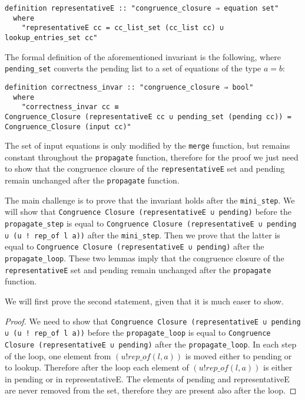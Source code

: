 \begin{lstlisting}
definition representativeE :: "congruence_closure ⇒ equation set"
  where
    "representativeE cc = cc_list_set (cc_list cc) ∪ lookup_entries_set cc"
\end{lstlisting}

The formal definition of the aforementioned invariant is the following, where \lstinline{pending_set} converts the pending list to a set of equations of the type $a = b$:

\begin{lstlisting}
definition correctness_invar :: "congruence_closure ⇒ bool"
  where
    "correctness_invar cc ≡
Congruence_Closure (representativeE cc ∪ pending_set (pending cc)) = Congruence_Closure (input cc)"
\end{lstlisting}

The set of input equations is only modified by the \lstinline{merge} function, but remains constant throughout the \lstinline{propagate} function, therefore for the proof we just need to show that the congruence closure of the \lstinline{representativeE} set and pending remain unchanged after the \lstinline{propagate} function.

The main challenge is to prove that the invariant holds after the \lstinline{mini_step}. We will show that \lstinline{Congruence Closure (representativeE ∪ pending)} before the \lstinline{propagate_step} is equal to \lstinline{Congruence Closure (representativeE ∪ pending ∪ (u ! rep_of l a))} after the \lstinline{mini_step}.
Then we prove that the latter is equal to \lstinline{Congruence Closure (representativeE ∪ pending)}  after the \lstinline{propagate_loop}.
These two lemmas imply that the congruence closure of the \lstinline{representativeE} set and pending remain unchanged after the \lstinline{propagate} function.

We will first prove the second statement, given that it is much easer to show.

\begin{proof}
We need to show that \lstinline{Congruence Closure (representativeE ∪ pending ∪ (u ! rep_of l a))} before the \lstinline{propagate_loop} is equal to \lstinline{Congruence Closure (representativeE ∪ pending)}  after the \lstinline{propagate_loop}. In each step of the loop, one element from $(u ! rep\_of(l, a))$ is moved either to pending or to lookup. Therefore after the loop each element of $(u ! rep\_of(l, a))$ is either in pending or in representativeE. The elements of pending and representativeE are never removed from the set, therefore they are present also after the loop.
\end{proof}

